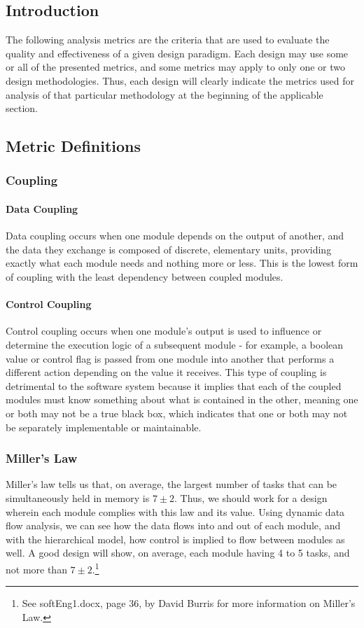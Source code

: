 \documentclass{article}
\begin{document}
	\subsection{Introduction}
		The following analysis metrics are the criteria that are used to evaluate the quality and effectiveness of a given design paradigm. Each design may use some or all of the presented metrics, and some metrics may apply to only one or two design methodologies. Thus, each design will clearly indicate the metrics used for analysis of that particular methodology at the beginning of the applicable section. 
	\subsection{Metric Definitions}
		\subsubsection{Coupling}
			\paragraph{Data Coupling}
				Data coupling occurs when one module depends on the output of another, and the data they exchange is composed of discrete, elementary units, providing exactly what each module needs and nothing more or less. This is the lowest form of coupling with the least dependency between coupled modules. 
			\paragraph{Control Coupling}
				Control coupling occurs when one module's output is used to influence or determine the execution logic of a subsequent module - for example, a boolean value or control flag is passed from one module into another that performs a different action depending on the value it receives. This type of coupling is detrimental to the software system because it implies that each of the coupled modules must know something about what is contained in the other, meaning one or both may not be a true black box, which indicates that one or both may not be separately implementable or maintainable. 
		\subsubsection{Miller's Law}
			Miller's law tells us that, on average, the largest number of tasks that can be simultaneously held in memory is $7\pm2$. Thus, we should work for a design wherein each module complies with this law and its value. Using dynamic data flow analysis, we can see how the data flows into and out of each module, and with the hierarchical model, how control is implied to flow between modules as well. A good design will show, on average, each module having 4 to 5 tasks, and not more than $7\pm2$.\footnote{See softEng1.docx, page 36, by David Burris for more information on Miller's Law.}  
\end{document}
